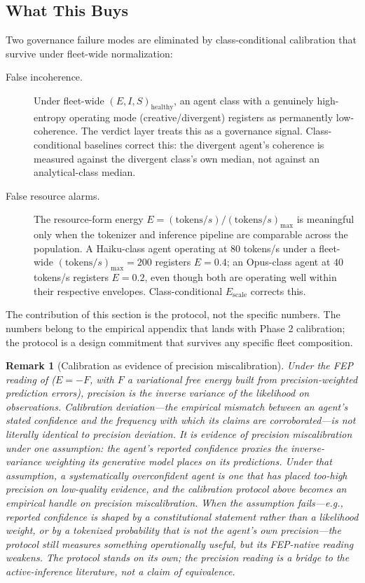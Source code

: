 \documentclass[11pt,twocolumn]{article}
\newtheorem{remark}[theorem]{Remark}
\begin{document}
\subsection{What This Buys}

Two governance failure modes are eliminated by class-conditional
calibration that survive under fleet-wide normalization:

\begin{description}
\item[False incoherence.] Under fleet-wide
  $(E,I,S)_{\text{healthy}}$, an agent class with a genuinely
  high-entropy operating mode (creative/divergent) registers as
  permanently low-coherence. The verdict layer treats this as a
  governance signal. Class-conditional baselines correct this:
  the divergent agent's coherence is measured against the
  divergent class's own median, not against an analytical-class
  median.
\item[False resource alarms.] The resource-form energy
  $E = (\text{tokens}/s) / (\text{tokens}/s)_{\max}$ is meaningful
  only when the tokenizer and inference pipeline are comparable
  across the population. A Haiku-class agent operating at $80$
  tokens/s under a fleet-wide
  $(\text{tokens}/s)_{\max} = 200$ registers
  $E = 0.4$; an Opus-class agent at $40$ tokens/s registers
  $E = 0.2$, even though both are operating well within their
  respective envelopes. Class-conditional
  $E_{\text{scale}}$ corrects this.
\end{description}

The contribution of this section is the protocol, not the
specific numbers. The numbers belong to the empirical
appendix that lands with Phase 2 calibration; the protocol is a
design commitment that survives any specific fleet composition.

\begin{remark}[Calibration as evidence of precision miscalibration]
\label{rem:calibration-precision}
Under the FEP reading of  ($E = -F$, with $F$
a variational free energy built from precision-weighted prediction
errors), precision is the inverse variance of the likelihood on
observations. Calibration deviation---the empirical mismatch
between an agent's stated confidence and the frequency with which
its claims are corroborated---is not literally identical to
precision deviation. It is \emph{evidence} of precision
miscalibration under one assumption: the agent's reported
confidence proxies the inverse-variance weighting its generative
model places on its predictions. Under that assumption, a
systematically overconfident agent is one that has placed
too-high precision on low-quality evidence, and the calibration
protocol above becomes an empirical handle on precision
miscalibration. When the assumption fails---e.g., reported
confidence is shaped by a constitutional statement rather than a
likelihood weight, or by a tokenized probability that is not the
agent's own precision---the protocol still measures something
operationally useful, but its FEP-native reading weakens. The
protocol stands on its own; the precision reading is a bridge to
the active-inference literature, not a claim of equivalence.
\end{remark}
\end{document}
